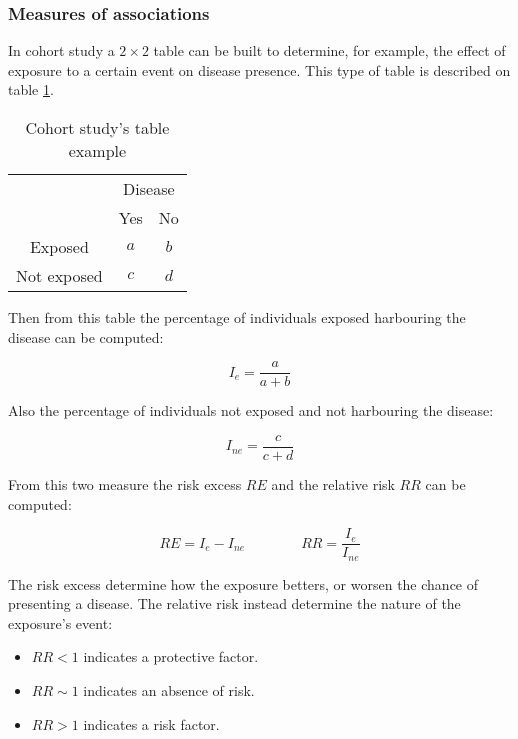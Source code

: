 		\subsubsection{Measures of associations}
		In cohort study a $2\times 2$ table can be built to determine, for example, the effect of exposure to a certain event on disease presence.
		This type of table is described on table \ref{tab:risk_table}.

		\begin{table}[H]
			\centering
			\begin{tabular}{ccc}
				 & \multicolumn{2}{c}{Disease}\\
				 & Yes & No \\
				 \cline{2-3}
				 Exposed & \multicolumn{1}{|c|}{$a$} & \multicolumn{1}{|c|}{$b$}\\
				 \cline{2-3}
				 Not exposed & \multicolumn{1}{|c|}{$c$} & \multicolumn{1}{|c|}{$d$}\\
				 \cline{2-3}
			\end{tabular}
			\caption{Cohort study's table example}
			\label{tab:risk_table}
		\end{table}

		Then from this table the percentage of individuals exposed harbouring the disease can be computed:

		$$I_e = \frac{a}{a+b}$$

		Also the percentage of individuals not exposed and not harbouring the disease:

		$$I_{ne} = \frac{c}{c+d}$$

		From this two measure the risk excess $RE$ and the relative risk $RR$ can be computed:

		$$RE = I_e - I_{ne} \qquad\qquad RR= \frac{I_e}{I_{ne}}$$

		The risk excess determine how the exposure betters, or worsen the chance of presenting a disease.
		The relative risk instead determine the nature of the exposure's event:

		\begin{multicols}{3}
			\begin{itemize}
				\item $RR<1$ indicates a protective factor.
				\item $RR \sim 1$ indicates an absence of risk.
				\item $RR> 1$ indicates a risk factor.
			\end{itemize}
		\end{multicols}

